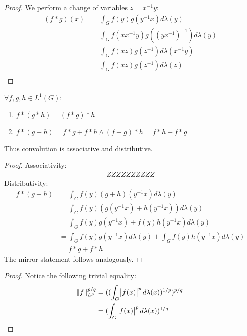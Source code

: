 \begin{proof}
We perform a change of variables $z = x^{-1}y$:
\begin{align*}
(f \ast g)(x) &= \int_G f(y)g(y^{-1}x) d\lambda(y) \\
&= \int_G f(xx^{-1}y)g((yx^{-1})^{-1}) d\lambda(y) \\
\tag{Left Invariance}
&= \int_G f(xz)g(z^{-1}) d\lambda(x^{-1}y) \\
&= \int_G f(xz)g(z^{-1}) d\lambda(z) \\
\end{align*}
\end{proof}

\begin{proposition}

$\forall f,g,h \in L^1(G):$
\begin{enumerate}
\item
$f \ast (g \ast h) = (f \ast g) \ast h $
\item
$f \ast (g + h) = f \ast g + f \ast h \wedge (f+g) \ast h = f\ast h + f\ast g $
\end{enumerate}
Thus convolution is associative and distributive.
\end{proposition}

\begin{proof}
Associativity:
\begin{align*}
ZZZZZZZZZZ
\end{align*}
Distributivity:
\begin{align*}
f \ast (g + h) &= \int_G f(y) (g+h)(y^{-1}x)d\lambda(y)\\
&= \int_G f(y) (g(y^{-1}x)+h(y^{-1}x))d\lambda(y)\\
&= \int_G f(y)g(y^{-1}x)+f(y)h(y^{-1}x)d\lambda(y)\\
&= \int_G f(y)g(y^{-1}x) d\lambda(y) + \int_G f(y)h(y^{-1}x) d\lambda(y)\\
&= f \ast g + f \ast h
\end{align*}
The mirror statement follows analogously. 
\end{proof}

\begin{remark}
\begin{proof} Notice the following trivial equality:\begin{align*}
\norm{f}^{p/q}_{L^p} &= (( \int_G \abs{f(x)}^p d\lambda(x) )^{1/p} ) ^ {p/q} \\
&= (\int_G \abs{f(x)}^p d\lambda(x) )^{1/q}
\end{align*} \end{proof}
\end{remark}

